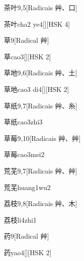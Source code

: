 \begin{entry}{茶叶}{9,5}[Radicais ⾋、⼝]
  \begin{phonetics}{茶叶}{cha2 ye4}[][HSK 4]
  \end{phonetics}
\end{entry}

\begin{entry}{草}{9}[Radical ⾋]
  \begin{phonetics}{草}{cao3}[][HSK 2]
  \end{phonetics}
\end{entry}

\begin{entry}{草地}{9,6}[Radicais ⾋、⼟]
  \begin{phonetics}{草地}{cao3 di4}[][HSK 2]
  \end{phonetics}
\end{entry}

\begin{entry}{草纸}{9,7}[Radicais ⾋、⽷]
  \begin{phonetics}{草纸}{cao3zhi3}
  \end{phonetics}
\end{entry}

\begin{entry}{草莓}{9,10}[Radicais ⾋、⾋]
  \begin{phonetics}{草莓}{cao3mei2}
  \end{phonetics}
\end{entry}

\begin{entry}{荒芜}{9,7}[Radicais ⾋、⾋]
  \begin{phonetics}{荒芜}{huang1wu2}
  \end{phonetics}
\end{entry}

\begin{entry}{荔枝}{9,8}[Radicais ⾋、⽊]
  \begin{phonetics}{荔枝}{li4zhi1}
  \end{phonetics}
\end{entry}

\begin{entry}{药}{9}[Radical ⾋]
  \begin{phonetics}{药}{yao4}[][HSK 2]
  \end{phonetics}
\end{entry}

